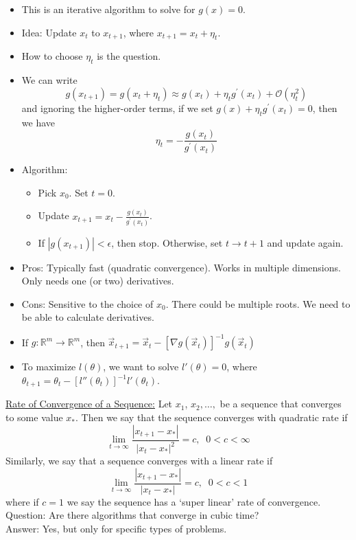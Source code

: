 \documentclass[a4paper, 10pt]{article}
\begin{document}
\begin{itemize}
	\item This is an iterative algorithm to solve for $g(x)=0$.
	\item Idea: Update $x_t$ to $x_{t+1}$, where $x_{t+1} = x_t + \eta_t$. 
	\item How to choose $\eta_t$ is the question.
	\item We can write 
				$$g(x_{t+1}) = g(x_t + \eta_t) \approx g(x_t) + \eta_t g^\prime(x_t) + \mathcal{O}(\eta^2_t)$$
				and ignoring the higher-order terms, if we set $g(x) + \eta_tg^\prime(x_t) = 0$, then we have 
				$$\eta_t = -\frac{g(x_t)}{g^\prime(x_t)}$$
	\item Algorithm:
	\begin{itemize}
		\item Pick $x_0$. Set $t=0$.
		\item Update $x_{t+1} = x_t - \frac{g(x_t)}{g^\prime(x_t)}$.
		\item If $|g(x_{t+1})| < \epsilon$, then stop. Otherwise, set $t \to t+1$ and update again. 
	\end{itemize}
	
	\item Pros: Typically fast (quadratic convergence). Works in multiple dimensions. Only needs one (or two) derivatives. 
	\item Cons: Sensitive to the choice of $x_0$. There could be multiple roots. We need to be able to calculate derivatives. 
	\item If $g:\mathbb{R}^m \rightarrow \mathbb{R}^m$, then $\vec{x}_{t+1} = \vec{x}_t - \left [\nabla g(\vec{x}_t) \right ] ^{-1} g(\vec{x}_t)$ 
	\item To maximize $l(\theta)$, we want to solve $l'(\theta) =0$, where $\theta_{t+1} = \theta_t - \left [l''(\theta_t) \right ] ^{-1} l'(\theta_t)$. 
\end{itemize}
\vspace{0.3in}
\underline{Rate of Convergence of a Sequence:}
Let $x_1$, $x_2, \dots, $ be a sequence that converges to some value $x_*$. Then we say that the sequence converges with quadratic rate if 
$$\underset{t\to \infty}{\lim} \frac{|x_{t+1} - x_* |}{|x_t - x_*|^2} = c, \; \; 0 < c < \infty$$ 
Similarly, we say that a sequence converges with a linear rate if 
$$\underset{t\to \infty}{\lim} \frac{|x_{t+1} - x_* |}{|x_t - x_*|} = c, \; \; 0 < c < 1$$
where if $c=1$ we say the sequence has a `super linear' rate of convergence. \\
Question: Are there algorithms that converge in cubic time?\\
Answer: Yes, but only for specific types of problems.  
\end{document}
